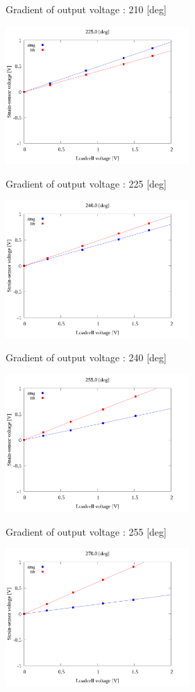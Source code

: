 \begin{multicols}{2}
\begin{figure_here}
\begin{center}
            \caption{Gradient of output voltage : 210 [deg]}
            \includegraphics[width=70mm]{../../02_workspace/result/2-1/plot/04/04_linear_2250.png}
            \caption{Gradient of output voltage : 225 [deg]}
            \includegraphics[width=70mm]{../../02_workspace/result/2-1/plot/04/04_linear_2400.png}
            \caption{Gradient of output voltage : 240 [deg]}
            \includegraphics[width=70mm]{../../02_workspace/result/2-1/plot/04/04_linear_2550.png}
            \caption{Gradient of output voltage : 255 [deg]}
            \includegraphics[width=70mm]{../../02_workspace/result/2-1/plot/04/04_linear_2700.png}

\end{center}
\end{figure_here}
\end{multicols}
